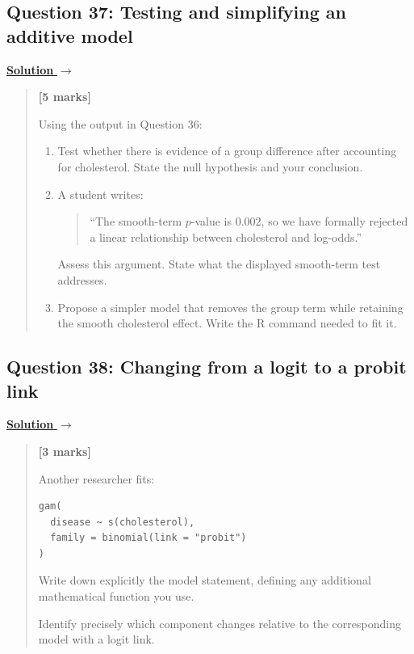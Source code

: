 \documentclass[11pt,a4paper]{article}
\newenvironment{examquestion}[2]
  {\subsection{#1}\label{question:\arabic{subsection}}\label{#2}%
   \noindent\hyperref[answer:\arabic{subsection}]{\textbf{Solution} $\rightarrow$}%
   \begin{quote}\color{statgrey}}
  {\end{quote}}
\begin{document}
\clearpage

\begin{examquestion}{Question 37: Testing and simplifying an additive model}{question:practice-testing-and-simplifying-an-additive-model}
\textbf{[5 marks]}

Using the output in Question 36:
\begin{enumerate}[label=(\alph*)]
  \item Test whether there is evidence of a group difference after
        accounting for cholesterol. State the null hypothesis and your
        conclusion.
  \item A student writes:
        \begin{quote}
        ``The smooth-term $p$-value is $0.002$, so we have formally rejected
        a linear relationship between cholesterol and log-odds.''
        \end{quote}
        Assess this argument. State what the displayed smooth-term test
        addresses.
  \item Propose a simpler model that removes the group term while
        retaining the smooth cholesterol effect. Write the R command
        needed to fit it.
\end{enumerate}
\end{examquestion}

\clearpage

\begin{examquestion}{Question 38: Changing from a logit to a probit link}{question:practice-changing-from-a-logit-to-a-probit-link}
\textbf{[3 marks]}

Another researcher fits:
\begin{verbatim}
gam(
  disease ~ s(cholesterol),
  family = binomial(link = "probit")
)
\end{verbatim}
Write down explicitly the model statement, defining any additional
mathematical function you use.

Identify precisely which component changes relative to the corresponding
model with a logit link.
\end{examquestion}

\clearpage
\end{document}
